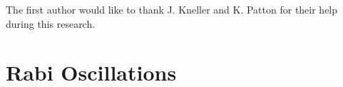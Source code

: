 \documentclass[%
reprint,
 amsmath,amssymb,
 prd,
]{revtex4-1}
\begin{document}
The first author would like to thank J. Kneller and K. Patton for their help during this research. 









\appendix


\section{\label{sec:rabi-oscillations}Rabi Oscillations}

\end{document}
